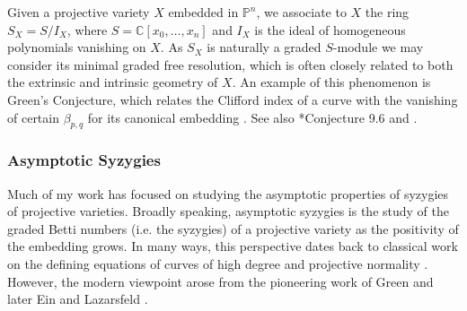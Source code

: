 \documentclass[11pt,reqno]{amsart}
\newtheorem{theorem}[lemma]{Theorem}
\theoremstyle{remark}
\newcommand{\C}{\mathbb{C}}
\renewcommand{\P}{\mathbb{P}}
\begin{document}
Given a projective variety $X$ embedded in $\P^n$, we associate to $X$ the ring $S_X=S/I_X$, where $S=\C[x_0,\ldots,x_n]$ and $I_X$ is the ideal of homogeneous polynomials vanishing on $X$. As $S_X$ is naturally a graded $S$-module we may consider its minimal graded free resolution, which is often closely related to both the extrinsic and intrinsic geometry of $X$.  An example of this phenomenon
 is Green's Conjecture, which relates the Clifford index of a curve with the vanishing of certain $\beta_{p,q}$ for its canonical embedding \cite{voisin02, voisin05, aproduFarkas19}. See also \cite{eisenbud05}*{Conjecture 9.6} and \cite{schreyer86, bayerEisenbud91}.


\subsubsection{Asymptotic Syzygies}

Much of my work has focused on studying the asymptotic properties of syzygies of projective varieties. Broadly speaking, asymptotic syzygies is the study of the graded Betti numbers (i.e. the syzygies) of a projective variety as the positivity of the embedding grows. In many ways, this perspective dates back to classical work on the defining equations of curves of high degree and projective normality \cite{mumford66, mumford70}. However, the modern viewpoint arose from the pioneering work of Green \cite{green84-I, green84-II} and later Ein and Lazarsfeld \cite{einLazarsfeld12}. 
\end{document}
